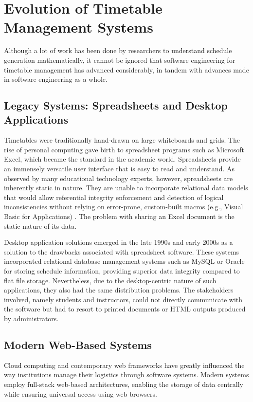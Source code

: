 \section{Evolution of Timetable Management Systems}

Although a lot of work has been done by researchers to understand schedule generation mathematically, it cannot be ignored that software engineering for timetable management has advanced considerably, in tandem with advances made in software engineering as a whole.

\subsection{Legacy Systems: Spreadsheets and Desktop Applications}
Timetables were traditionally hand-drawn on large whiteboards and grids. The rise of personal computing gave birth to spreadsheet programs such as Microsoft Excel, which became the standard in the academic world. Spreadsheets provide an immensely versatile user interface that is easy to read and understand. As observed by many educational technology experts, however, spreadsheets are inherently static in nature. They are unable to incorporate relational data models that would allow referential integrity enforcement and detection of logical inconsistencies without relying on error-prone, custom-built macros (e.g., Visual Basic for Applications) \cite{panko1998what}. The problem with sharing an Excel document is the static nature of its data.

Desktop application solutions emerged in the late 1990s and early 2000s as a solution to the drawbacks associated with spreadsheet software. These systems incorporated relational database management systems such as MySQL or Oracle for storing schedule information, providing superior data integrity compared to flat file storage. Nevertheless, due to the desktop-centric nature of such applications, they also had the same distribution problems. The stakeholders involved, namely students and instructors, could not directly communicate with the software but had to resort to printed documents or HTML outputs produced by administrators.

\subsection{Modern Web-Based Systems}
Cloud computing and contemporary web frameworks have greatly influenced the way institutions manage their logistics through software systems. Modern systems employ full-stack web-based architectures, enabling the storage of data centrally while ensuring universal access using web browsers.

